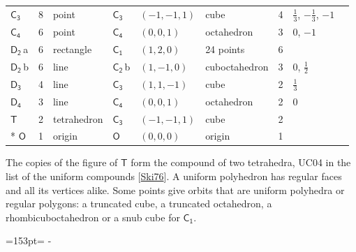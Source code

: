 \documentclass[10pt,a4paper]{article}
\newcommand{\needspace}[1]{\par\penalty-100\begingroup\dimen0=#1\relax\dimen2=\pagegoal
  \advance\dimen2-\pagetotal\ifdim\dimen0>\dimen2\relax\ifdim\dimen2>0pt\vfil\break\fi\fi
  \endgroup}
\numberwithin{equation}{section}
\newcommand{\grp}[1]{\mathsf{#1}}
\newcommand{\clsletter}[1]{\,{\scriptsize\color{black!55}#1}}
\newlength{\fillwidth}\newlength{\cellwidth}\newlength{\colwidth}
\begin{document}
{{\begin{longtable}{@{}lrllllr>{\RaggedRight\arraybackslash}p{\fillwidth}r@{}}
\href{C3.pdf}{$\grp{C_{3}}$} & 8 & point & \href{C3.pdf}{$\grp{C_{3}}$} & $(-1, -1, 1)$ & cube & 4 & ${\tfrac{1}{3}}$, ${-\tfrac{1}{3}}$, ${-1}$ & \\
\href{C4.pdf}{$\grp{C_{4}}$} & 6 & point & \href{C4.pdf}{$\grp{C_{4}}$} & $(0, 0, 1)$ & octahedron & 3 & ${0}$, ${-1}$ & \\
\href{D2.pdf}{$\grp{D_{2}}$}\clsletter{a} & 6 & rectangle & \href{C1.pdf}{$\grp{C_{1}}$} & $(1, 2, 0)$ & 24 points & 6 &  & \\
\href{D2.pdf}{$\grp{D_{2}}$}\clsletter{b} & 6 & line & \href{C2.pdf}{$\grp{C_{2}}$}\clsletter{b} & $(1, -1, 0)$ & cuboctahedron & 3 & ${0}$, ${\tfrac{1}{2}}$ & \\
\href{D3.pdf}{$\grp{D_{3}}$} & 4 & line & \href{C3.pdf}{$\grp{C_{3}}$} & $(1, 1, -1)$ & cube & 2 & ${\tfrac{1}{3}}$ & \\
\href{D4.pdf}{$\grp{D_{4}}$} & 3 & line & \href{C4.pdf}{$\grp{C_{4}}$} & $(0, 0, 1)$ & octahedron & 2 & ${0}$ & \\
\href{T.pdf}{$\grp{T}$} & 2 & tetrahedron & \href{C3.pdf}{$\grp{C_{3}}$} & $(-1, -1, 1)$ & cube & 2 &  & \\*
\href{O.pdf}{$\grp{O}$} & 1 & origin & \href{O.pdf}{$\grp{O}$} & $(0, 0, 0)$ & origin & 1 &  & \\
\bottomrule\end{longtable}}}
The copies of the figure of \href{T.pdf}{$\grp{T}$} form the compound of two tetrahedra, UC04 in the list of the uniform compounds [\href{../../../REFERENCES.pdf\#ref.Ski76}{Ski76}]. A uniform polyhedron has regular faces and all its vertices alike. Some points give orbits that are uniform polyhedra or regular polygons: a truncated cube, a truncated octahedron, a rhombicuboctahedron or a snub cube for \href{C1.pdf}{$\grp{C_{1}}$}.
\needspace{153pt}
\end{document}
